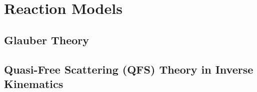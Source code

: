 \section{Reaction Models}
\subsection{Glauber Theory}
\subsection{Quasi-Free Scattering (QFS) Theory in Inverse Kinematics}
